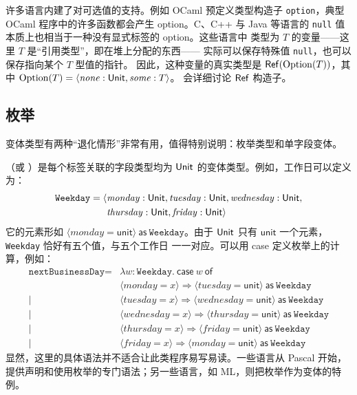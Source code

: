 许多语言内建了对可选值的支持。例如 OCaml 预定义类型构造子
\texttt{option}，典型 OCaml 程序中的许多函数都会产生 option。C、C++ 与
Java 等语言的 \texttt{null} 值本质上也相当于一种没有显式标签的 option。这些语言中
类型为 \(T\) 的变量——这里 \(T\) 是“引用类型”，即在堆上分配的东西——
实际可以保存特殊值 \texttt{null}，也可以保存指向某个 \(T\) 型值的指针。
因此，这种变量的真实类型是
\(\mathsf{Ref}(\operatorname{Option}(T))\)，其中
\(\operatorname{Option}(T)=
\langle\mathit{none}:\mathsf{Unit},\mathit{some}:T\rangle\)。
会详细讨论 \(\mathsf{Ref}\) 构造子。

\subsection*{枚举}

变体类型有两种“退化情形”非常有用，值得特别说明：枚举类型和单字段变体。

（或
）是每个标签关联的字段类型均为
\(\mathsf{Unit}\) 的变体类型。例如，工作日可以定义为：
\[
\begin{aligned}
\texttt{Weekday}=\langle&
\mathit{monday}:\mathsf{Unit},
\mathit{tuesday}:\mathsf{Unit},
\mathit{wednesday}:\mathsf{Unit},\\
&\mathit{thursday}:\mathsf{Unit},
\mathit{friday}:\mathsf{Unit}\rangle
\end{aligned}
\]
它的元素形如
\(\langle\mathit{monday}=\mathsf{unit}\rangle\
\mathsf{as}\ \texttt{Weekday}\)。由于 \(\mathsf{Unit}\) 只有
\(\mathsf{unit}\) 一个元素，\texttt{Weekday} 恰好有五个值，与五个工作日
一一对应。可以用 case 定义枚举上的计算，例如：
\[
\begin{aligned}
\texttt{nextBusinessDay}={}&\lambda w:\texttt{Weekday}.\
\mathsf{case}\ w\ \mathsf{of}\\
&\langle\mathit{monday}=x\rangle\Rightarrow
 \langle\mathit{tuesday}=\mathsf{unit}\rangle\ \mathsf{as}\ \texttt{Weekday}\\
\mid{}&\langle\mathit{tuesday}=x\rangle\Rightarrow
 \langle\mathit{wednesday}=\mathsf{unit}\rangle\ \mathsf{as}\ \texttt{Weekday}\\
\mid{}&\langle\mathit{wednesday}=x\rangle\Rightarrow
 \langle\mathit{thursday}=\mathsf{unit}\rangle\ \mathsf{as}\ \texttt{Weekday}\\
\mid{}&\langle\mathit{thursday}=x\rangle\Rightarrow
 \langle\mathit{friday}=\mathsf{unit}\rangle\ \mathsf{as}\ \texttt{Weekday}\\
\mid{}&\langle\mathit{friday}=x\rangle\Rightarrow
 \langle\mathit{monday}=\mathsf{unit}\rangle\ \mathsf{as}\ \texttt{Weekday}
\end{aligned}
\]
显然，这里的具体语法并不适合让此类程序易写易读。一些语言从 Pascal 开始，
提供声明和使用枚举的专门语法；另一些语言，如 ML，则把枚举作为变体的特例。

